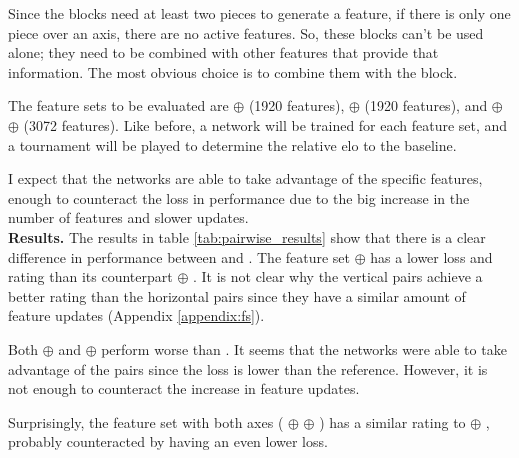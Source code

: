 Since the blocks need at least two pieces to generate a feature, if there is only one piece over an axis, there are no active features. So, these blocks can't be used alone; they need to be combined with other features that provide that information. The most obvious choice is to combine them with the  block.

The feature sets to be evaluated are  $\oplus$  (1920 features),  $\oplus$  (1920 features), and  $\oplus$  $\oplus$  (3072 features). Like before, a network will be trained for each feature set, and a tournament will be played to determine the relative elo to the  baseline.

I expect that the networks are able to take advantage of the specific features, enough to counteract the loss in performance due to the big increase in the number of features and slower updates. \\

\textbf{Results.} The results in table \ref{tab:pairwise_results} show that there is a clear difference in performance between  and . The feature set  $\oplus$  has a lower loss and rating than its counterpart  $\oplus$ . It is not clear why the vertical pairs achieve a better rating than the horizontal pairs since they have a similar amount of feature updates (Appendix \ref{appendix:fs}).

Both  $\oplus$  and  $\oplus$  perform worse than . It seems that the networks were able to take advantage of the pairs since the loss is lower than the reference. However, it is not enough to counteract the increase in feature updates.

Surprisingly, the feature set with both axes ( $\oplus$  $\oplus$ ) has a similar rating to  $\oplus$ , probably counteracted by having an even lower loss.

